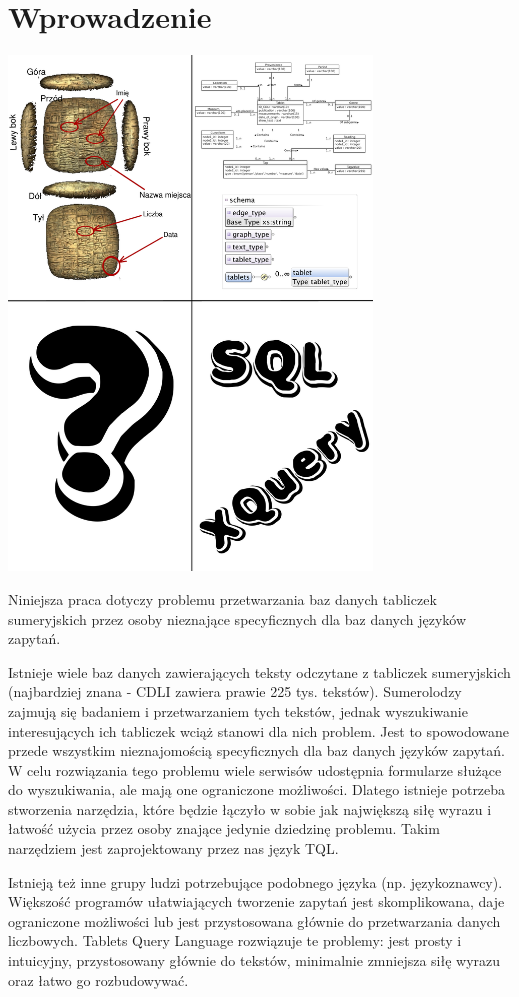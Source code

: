 \chapter*{Wprowadzenie}
\includegraphics[width=365px]{./diagramy/poco.pdf}
 
 
Niniejsza praca dotyczy problemu przetwarzania baz danych tabliczek sumeryjskich przez osoby nieznające specyficznych dla baz danych języków zapytań.

Istnieje wiele baz danych zawierających teksty odczytane z tabliczek sumeryjskich (najbardziej znana - CDLI zawiera prawie 225 tys. tekstów). Sumerolodzy zajmują się badaniem i przetwarzaniem tych tekstów, jednak wyszukiwanie interesujących ich tabliczek wciąż stanowi dla nich problem. Jest to spowodowane przede wszystkim nieznajomością specyficznych dla baz danych języków zapytań. W celu rozwiązania tego problemu wiele serwisów udostępnia formularze służące do wyszukiwania, ale mają one ograniczone możliwości. Dlatego istnieje potrzeba stworzenia narzędzia, które będzie łączyło w sobie jak największą siłę wyrazu i łatwość użycia przez osoby znające jedynie dziedzinę problemu. Takim narzędziem jest zaprojektowany przez nas język TQL. 


Istnieją też inne grupy ludzi potrzebujące podobnego języka (np. językoznawcy). 
Większość programów ułatwiających tworzenie zapytań jest skomplikowana, daje ograniczone możliwości lub jest przystosowana głównie do przetwarzania danych liczbowych. Tablets Query Language rozwiązuje te problemy: jest prosty i intuicyjny, przystosowany głównie do tekstów, minimalnie zmniejsza siłę wyrazu oraz łatwo go rozbudowywać. 

